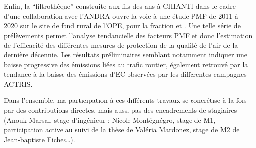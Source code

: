 
Enfin, la ``filtrothèque'' construite aux fils des ans à CHIANTI dans le cadre d'une
collaboration avec l'ANDRA ouvre la voie à une étude PMF de 2011 à 2020 sur le site de fond
rural de l'OPE, pour la fraction \PMdix{} et \PMdc. Une telle série de prélèvements permet
l'analyse tendancielle des facteurs PMF et donc l'estimation de l'efficacité des
différentes mesures de protection de la qualité de l'air de la dernière décennie. Les
résultats préliminaires semblant notamment indiquer une baisse progressive des émissions
liées au trafic routier, également retrouvé par la tendance à la baisse des émissions d'EC
observées par les différentes campagnes ACTRIS.


Dans l'ensemble, ma participation à ces différents travaux se concrétise à la fois par
des contributions directes, mais aussi pas des encadrements de stagiaires (Anouk Marsal,
stage d'ingénieur ; Nicole Montégnégro, stage de M1, participation active au suivi de la
thèse de Valéria Mardonez, stage de M2 de Jean-baptiste Fiches…).

%

